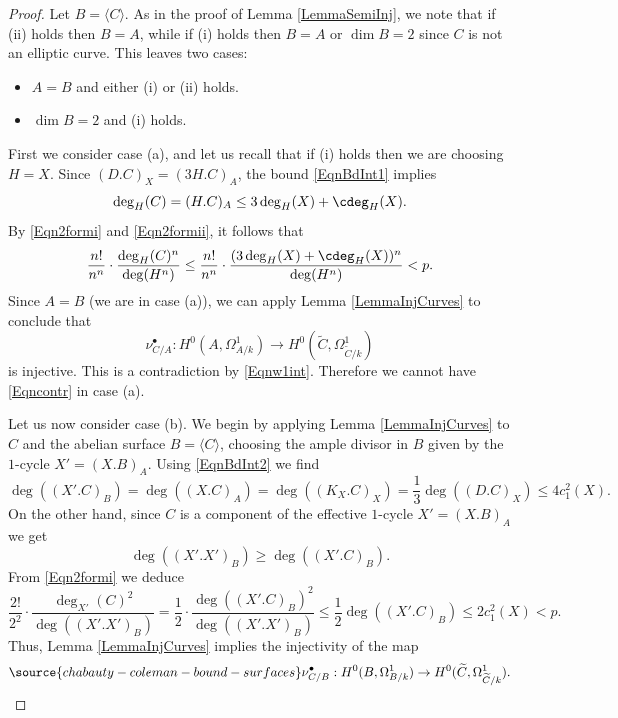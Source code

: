 \begin{proof}
Let $B=\langle C\rangle$. As in the proof of Lemma \ref{LemmaSemiInj}, we note that if (ii) holds then $B=A$, while if (i) holds then $B=A$ or $\dim B=2$ since $C$ is not an elliptic curve. This leaves two cases:
\begin{itemize}
\item[(a)] $A=B$ and either (i) or (ii) holds.
\item[(b)] $\dim B=2$ and (i) holds.
\end{itemize}


First we consider case (a), and let us recall that if (i) holds then we are choosing $H=X$. Since $(D.C)_X=(3H.C)_A$, the bound \eqref{EqnBdInt1} implies
$$
\deg_H(C)=(H.C)_A\le 3\deg_H(X) + \cdeg_H(X).
$$
By  \eqref{Eqn2formi} and \eqref{Eqn2formii}, it follows that
$$
\frac{n!}{n^n}\cdot \frac{\deg_H(C)^n}{\deg(H^n)} \le  \frac{n!}{n^n}\cdot \frac{(3\deg_H(X) + \cdeg_H(X))^n}{\deg(H^n)}<p.
$$
Since $A=B$ (we are in case (a)), we can apply Lemma \ref{LemmaInjCurves}  to conclude that
$$
\nu_{C/A}^\bullet :H^0(A,\Omega^1_{A/k})\to H^0(\widetilde{C},\Omega^1_{\widetilde{C}/k})
$$
is injective. This is a contradiction by \eqref{Eqnw1int}. Therefore we cannot have \eqref{Eqncontr} in case (a).


Let us now consider case (b). We begin by applying Lemma \ref{LemmaInjCurves} to $C$ and the abelian surface $B=\langle C\rangle$, choosing the ample divisor in $B$ given by the $1$-cycle $X'=(X.B)_A$.  Using \eqref{EqnBdInt2} we find
$$
\deg((X'.C)_B) = \deg((X.C)_A) =\deg((K_X.C)_X)=\frac{1}{3}\deg((D.C)_X)\le 4c_1^2(X).
$$
On the other hand, since $C$ is a component of the effective $1$-cycle $X'=(X.B)_A$ we get
$$
\deg((X'.X')_B) \ge \deg((X'.C)_B).
$$
From  \eqref{Eqn2formi} we deduce
$$
\frac{2!}{2^2}\cdot \frac{\deg_{X'}(C)^2}{\deg((X'.X')_B)}=\frac{1}{2}\cdot\frac{\deg((X'.C)_B)^2}{\deg((X'.X')_B)}\le \frac{1}{2}\deg((X'.C)_B)\le 2c_1^2(X)<p.
$$
Thus, Lemma \ref{LemmaInjCurves} implies the injectivity of the map
\begin{equation}\label{EqnnuCB}
\source{chabauty-coleman-bound-surfaces}
\nu^\bullet_{C/B}:H^0(B,\Omega^1_{B/k})\to H^0(\widetilde{C},\Omega^1_{\widetilde{C}/k}).
\end{equation}



\end{proof}
